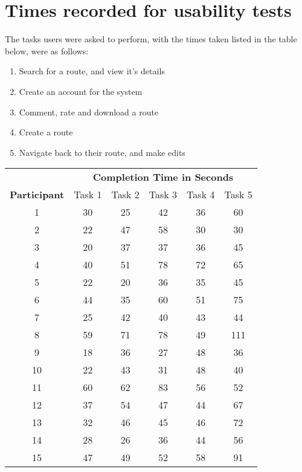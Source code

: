 \section{Times recorded for usability tests}
\label{sec:trfut}

The tasks users were asked to perform, with the times taken listed in the table below, were as follows:
\begin{enumerate}
	\item Search for a route, and view it's details
	\item Create an account for the system
	\item Comment, rate and download a route 
	\item Create a route
	\item Navigate back to their route, and make edits
\end{enumerate}

\begin{center}
	\begin{tabular}{c|ccccc}
		& \multicolumn{5}{c}{\textbf{Completion Time in Seconds}} \\
		\cline{2-6}
		\textbf{Participant}  & Task 1 & Task 2 & Task 3 & Task 4 & Task 5 \\
		\hline 
		1&30&25&42&36&60\\
		2&22&47&58&30&30\\
		3&20&37&37&36&45\\
	    4&40&51&78&72&65\\
		5&22&20&36&35&45\\
		6&44&35&60&51&75\\
		7&25&42&40&43&44\\
		8&59&71&78&49&111\\
		9&18&36&27&48&36\\
		10&22&43&31&48&40\\
		11&60&62&83&56&52\\
		12&37&54&47&44&67\\
		13&32&46&45&46&72\\
		14&28&26&36&44&56\\
		15&47&49&52&58&91\\
		\hline 
	\end{tabular}
\end{center}
